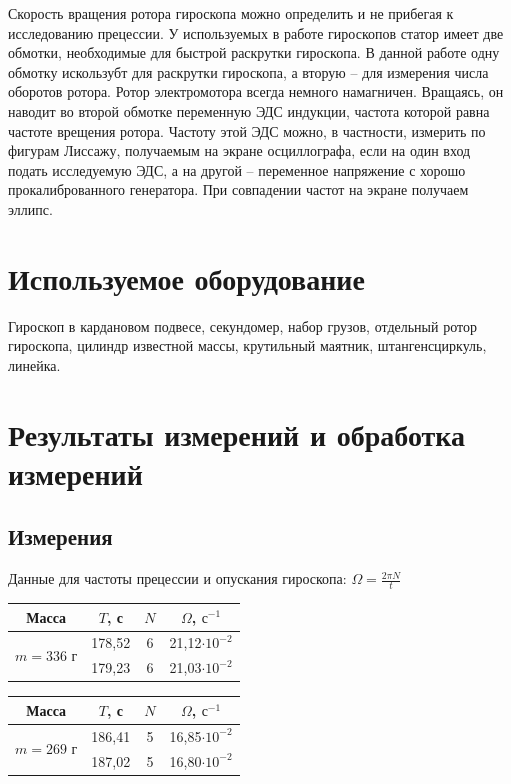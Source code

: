 \documentclass[a4paper,12pt]{article}
\begin{document}
	Скорость вращения ротора гироскопа можно определить и не прибегая к исследованию прецессии. У используемых в работе гироскопов статор имеет две обмотки, необходимые для быстрой раскрутки гироскопа. В данной работе одну обмотку искользубт для раскрутки гироскопа, а вторую -- для измерения числа оборотов ротора. Ротор электромотора всегда немного намагничен. Вращаясь, он наводит во второй обмотке переменную ЭДС индукции, частота которой равна частоте врещения ротора. Частоту этой ЭДС можно, в частности, измерить по фигурам Лиссажу, получаемым на экране осциллографа, если на один вход подать исследуемую ЭДС, а на другой -- переменное напряжение с хорошо прокалиброванного генератора. При совпадении частот на экране получаем эллипс.
	\section{Используемое оборудование}
	Гироскоп в кардановом подвесе, секундомер, набор грузов, отдельный ротор гироскопа, цилиндр известной массы, крутильный маятник, штангенсциркуль, линейка.

	\section{Результаты измерений и обработка измерений}
	\subsection{Измерения}
	Данные для частоты прецессии и опускания гироскопа: $\Omega=\frac{2\pi N}{t}$

	\begin{center}
		\begin{tabular}{|c|c|c|c|}
			\hline
			Масса & $T$, с& $N$ & $\Omega$, $\text{с}^{-1}$  \\
			\hline
			\multirow{2}{*}{$m = 336$ г}&178,52&6&21,12$\cdot 10^{-2}$ \\
			\cline{2-4}
			&179,23 & 6 &21,03$\cdot 10^{-2}$  \\
			\hline
		\end{tabular}
		\quad
		\begin{tabular}{|c|c|c|c|}
			\hline
			Масса & $T$, с& $N$ & $\Omega$, $\text{с}^{-1}$ \\
			\hline
			\multirow{2}{*}{$m = 269$ г}&186,41&5&16,85$\cdot 10^{-2}$ \\
			\cline{2-4}
			&187,02 & 5 &16,80$\cdot 10^{-2}$  \\
			\hline
		\end{tabular}
	\end{center}
\end{document}
